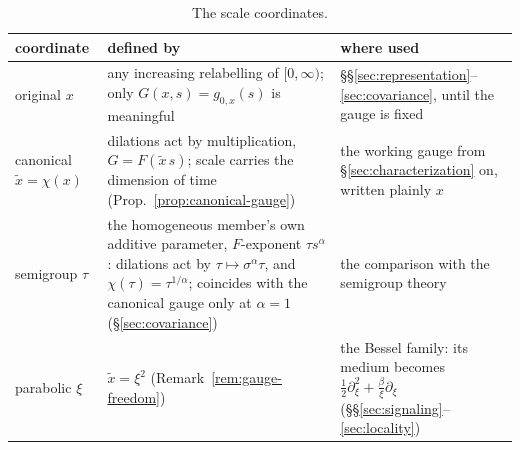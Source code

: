 \begin{table}[!tp]
\centering
\caption{The scale coordinates.}
\label{tab:gauges}
\footnotesize
\setlength{\tabcolsep}{4pt}
\begin{tabular}{@{}lp{6.4cm}p{5.2cm}@{}}
\toprule
coordinate & defined by & where used \\
\midrule
original $x$ & any increasing relabelling of $[0,\infty)$; only $G(x,s) = g_{0,x}(s)$ is meaningful & \S\S\ref{sec:representation}--\ref{sec:covariance}, until the gauge is fixed \\
canonical $\tilde x = \chi(x)$ & dilations act by multiplication, $G = F(\tilde x\,s)$; scale carries the dimension of time (Prop.~\ref{prop:canonical-gauge}) & the working gauge from \S\ref{sec:characterization} on, written plainly $x$ \\
semigroup $\tau$ & the homogeneous member's own additive parameter, $F$-exponent $\tau s^\alpha$: dilations act by $\tau \mapsto \sigma^\alpha \tau$, and $\chi(\tau) = \tau^{1/\alpha}$; coincides with the canonical gauge only at $\alpha = 1$ (\S\ref{sec:covariance}) & the comparison with the semigroup theory \\
parabolic $\xi$ & $\tilde x = \xi^2$ (Remark~\ref{rem:gauge-freedom}) & the Bessel family: its medium becomes $\tfrac12\partial_\xi^2 + \tfrac{\beta}{\xi}\partial_\xi$ (\S\S\ref{sec:signaling}--\ref{sec:locality}) \\
\bottomrule
\end{tabular}
\end{table}
